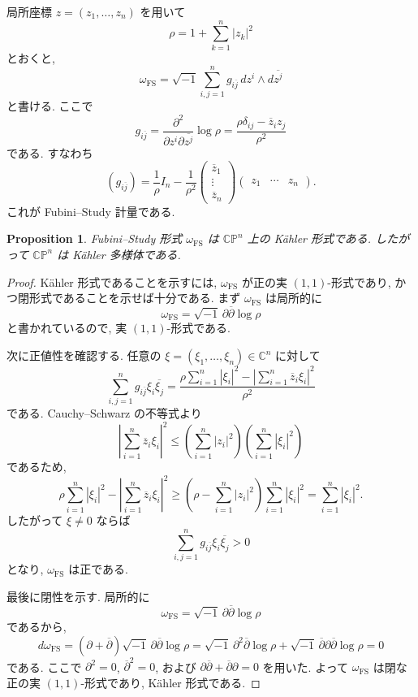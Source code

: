 \documentclass[dvipdfmx,a4paper,11pt]{article} %
\newtheorem{prop}[thm]{Proposition}
\theoremstyle{definition}
\theoremstyle{remark}
\numberwithin{equation}{section}
\newcommand{\C}{\mathbb{C}}
\begin{document}
局所座標 \(z=(z_1,\ldots,z_n)\) を用いて
\[
\rho=1+\sum_{k=1}^n |z_k|^2
\]
とおくと,
\[
\omega_{\mathrm{FS}}
=
\sqrt{-1}\sum_{i,j=1}^n
g_{i\overline{j}}\,dz^i\wedge d\overline{z^j}
\]
と書ける. ここで
\[
g_{i\overline{j}}
=
\frac{\partial^2}{\partial z^i\partial \overline{z^j}}
\log \rho
=
\frac{\rho\delta_{ij}-\overline z_i z_j}{\rho^2}
\]
である. すなわち
\[
(g_{i\overline{j}})
=
\frac{1}{\rho}I_n
-
\frac{1}{\rho^2}
\begin{pmatrix}
\overline z_1\\
\vdots\\
\overline z_n
\end{pmatrix}
\begin{pmatrix}
z_1&\cdots&z_n
\end{pmatrix}.
\]
これが Fubini--Study 計量である.

\begin{prop}
Fubini--Study 形式 \(\omega_{\mathrm{FS}}\) は \(\C\mathbb{P}^n\) 上の Kähler 形式である. したがって \(\C\mathbb{P}^n\) は Kähler 多様体である.
\end{prop}

\begin{proof}
Kähler 形式であることを示すには, \(\omega_{\mathrm{FS}}\) が正の実 \((1,1)\)-形式であり, かつ閉形式であることを示せば十分である. まず \(\omega_{\mathrm{FS}}\) は局所的に
\[
\omega_{\mathrm{FS}}
=
\sqrt{-1}\,\partial\overline{\partial}\log\rho
\]
と書かれているので, 実 \((1,1)\)-形式である.

次に正値性を確認する. 任意の \(\xi=(\xi_1,\ldots,\xi_n)\in\mathbb{C}^n\) に対して
\[
\sum_{i,j=1}^n
g_{i\overline{j}}\xi_i\overline{\xi_j}
=
\frac{\rho\sum_{i=1}^n|\xi_i|^2-\left|\sum_{i=1}^n \overline z_i \xi_i\right|^2}{\rho^2}
\]
である. Cauchy--Schwarz の不等式より
\[
\left|\sum_{i=1}^n \overline z_i \xi_i\right|^2
\leq
\left(\sum_{i=1}^n |z_i|^2\right)
\left(\sum_{i=1}^n |\xi_i|^2\right)
\]
であるため,
\[
\rho\sum_{i=1}^n|\xi_i|^2-\left|\sum_{i=1}^n \overline z_i \xi_i\right|^2
\geq
\left(\rho-\sum_{i=1}^n |z_i|^2\right)
\sum_{i=1}^n|\xi_i|^2
=
\sum_{i=1}^n|\xi_i|^2.
\]
したがって \(\xi\neq 0\) ならば
\[
\sum_{i,j=1}^n
g_{i\overline{j}}\xi_i\overline{\xi_j}>0
\]
となり, \(\omega_{\mathrm{FS}}\) は正である.

最後に閉性を示す. 局所的に
\[
\omega_{\mathrm{FS}}
=
\sqrt{-1}\,\partial\overline{\partial}\log\rho
\]
であるから,
\[
d\omega_{\mathrm{FS}}
=
(\partial+\overline{\partial})
\sqrt{-1}\,\partial\overline{\partial}\log\rho
=
\sqrt{-1}\,\partial^2\overline{\partial}\log\rho
+
\sqrt{-1}\,\overline{\partial}\partial\overline{\partial}\log\rho
=
0
\]
である. ここで \(\partial^2=0\), \(\overline{\partial}^2=0\), および \(\partial\overline{\partial}+\overline{\partial}\partial=0\) を用いた. よって \(\omega_{\mathrm{FS}}\) は閉な正の実 \((1,1)\)-形式であり, Kähler 形式である.
\end{proof}
\end{document}
